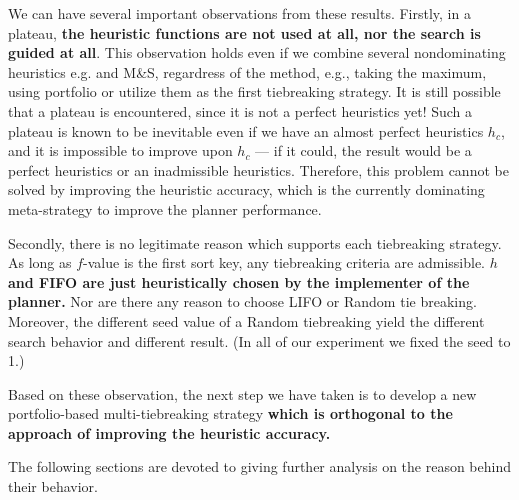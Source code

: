 We can have several important observations from these results.  Firstly, in a plateau, \textbf{the heuristic functions are not used at all, nor the search is guided at all}. This observation holds even if we combine several nondominating heuristics e.g. \lmcut and M\&S, regardress of the method, e.g., taking the maximum, using portfolio or utilize them as the first tiebreaking strategy. It is still possible that a plateau is encountered, since it is not a perfect heuristics yet!
Such a plateau is known to be inevitable even if we have an almost perfect heuristics $h_c$, and it is impossible to improve upon $h_c$ --- if it could, the result would be a perfect heuristics or an inadmissible heuristics. Therefore, this problem cannot be solved by improving the heuristic accuracy, which is the currently dominating meta-strategy to improve the planner performance.

Secondly, there is no legitimate reason which supports each tiebreaking strategy.
As long as $f$-value is the first sort key, any tiebreaking criteria are admissible. \textbf{$h$ and FIFO are just heuristically chosen by the implementer of the planner.} Nor are there any reason to choose LIFO or Random tie breaking. Moreover, the different seed value of a Random tiebreaking yield the different search behavior and different result. (In all of our experiment we fixed the seed to 1.)

Based on these observation, the next step we have taken is to develop a new
portfolio-based multi-tiebreaking strategy \textbf{which is orthogonal to
the approach of improving the heuristic accuracy.}

The following sections are devoted to giving further analysis on the
reason behind their behavior.
